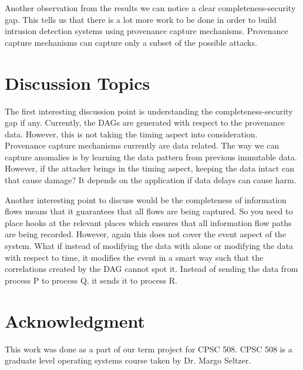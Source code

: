 \documentclass{IEEEtran}
\begin{document}
Another observation from the results we can notice a clear completeness-security gap. This tells us that there is a lot more work to be done in order to build intrusion detection systems using provenance capture mechanisms. Provenance capture mechanisms can capture only a subset of the possible attacks.

\section* {Discussion Topics}
The first interesting discussion point is understanding the completeness-security gap if any. Currently, the DAGs are generated with respect to the provenance data. However, this is not taking the timing aspect into consideration. Provenance capture mechanisms currently are data related. The way we can capture anomalies is by learning the data pattern from previous immutable data. However, if the attacker brings in the timing aspect, keeping the data intact can that cause damage? It depends on the application if data delays can cause harm. 

Another interesting point to discuss would be the completeness of information flows means that it guarantees that all flows are being captured. So you need to place hooks at the relevant places which ensures that all information flow paths are being recorded. However, again this does not cover the event aspect of the system. What if instead of modifying the data with alone or modifying the data with respect to time, it modifies the event in a smart way such that the correlations created by the DAG cannot spot it.  Instead of sending the data from process P to process Q, it sends it to process R. 
\section*{Acknowledgment}

This work was done as a part of our term project for CPSC 508. CPSC 508 is a graduate level operating systems course taken by Dr. Margo Seltzer.
\end{document}
